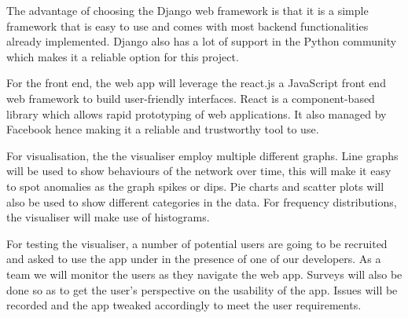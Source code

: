 The advantage of choosing the Django web framework is that it is a simple framework that is easy to use and comes with most backend functionalities already implemented. Django also has a lot of support in the Python community which makes it a reliable option for this project.

For the front end, the web app will leverage the react.js a JavaScript front end web framework to build user-friendly interfaces. React is a component-based library which allows rapid prototyping of web applications. It also managed by Facebook hence making it a reliable and trustworthy tool to use.

For visualisation, the the visualiser employ multiple different graphs. Line graphs will be used to show behaviours of the network over time, this will make it easy to spot anomalies as the graph spikes or dips. Pie charts and scatter plots will also be used to show different categories in the data. For frequency distributions, the visualiser will make use of histograms.

For testing the visualiser, a number of potential users are going to be recruited and asked to use the app under in the presence of one of our developers. As a team we will monitor the users as they navigate the web app. Surveys will also be done so as to get the user’s perspective on the usability of the app. Issues will be recorded and the app tweaked accordingly to meet the user requirements.
